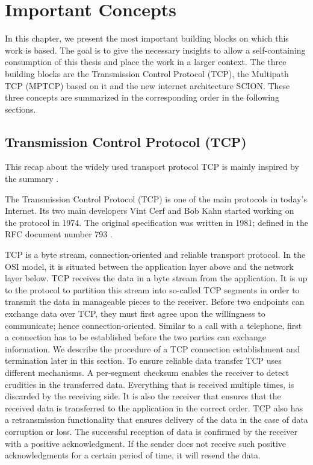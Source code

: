 
\chapter{Important Concepts}
\label{chap:Concepts}
In this chapter, we present the most important building blocks on which this work is based. The goal is to give the necessary insights to allow a self-containing consumption of this thesis and place the work in a larger context. The three building blocks are the Transmission Control Protocol (TCP), the Multipath TCP (MPTCP) based on it and the new internet architecture SCION. These three concepts are summarized in the corresponding order in the following sections.

\section{Transmission Control Protocol (TCP)}
\label{sec:TCP}

This recap about the widely used transport protocol TCP is mainly inspired by the summary \cite{TCPSummary}.

The Transmission Control Protocol (TCP) is one of the main protocols in today's Internet. Its two main developers Vint Cerf and Bob Kahn started working on the protocol in 1974. The original specification was written in 1981; defined in the RFC document number 793 \cite{rfc793}.

TCP is a byte stream, connection-oriented and reliable transport protocol. In the OSI model, it is situated between the application layer above and the network layer below. TCP receives the data in a byte stream from the application. It is up to the protocol to partition this stream into so-called TCP segments in order to transmit the data in manageable pieces to the receiver. Before two endpoints can exchange data over TCP, they must first agree upon the willingness to communicate; hence connection-oriented. Similar to a call with a telephone, first a connection has to be established before the two parties can exchange information. We describe the procedure of a TCP connection establishment and termination later in this section. To ensure reliable data transfer TCP uses different mechanisms. A per-segment checksum enables the receiver to detect crudities in the transferred data. Everything that is received multiple times, is discarded by the receiving side. It is also the receiver that ensures that the received data is transferred to the application in the correct order. TCP also has a retransmission functionality that ensures delivery of the data in the case of data corruption or loss. The successful reception of data is confirmed by the receiver with a positive acknowledgment. If the sender does not receive such positive acknowledgments for a certain period of time, it will resend the data. 

